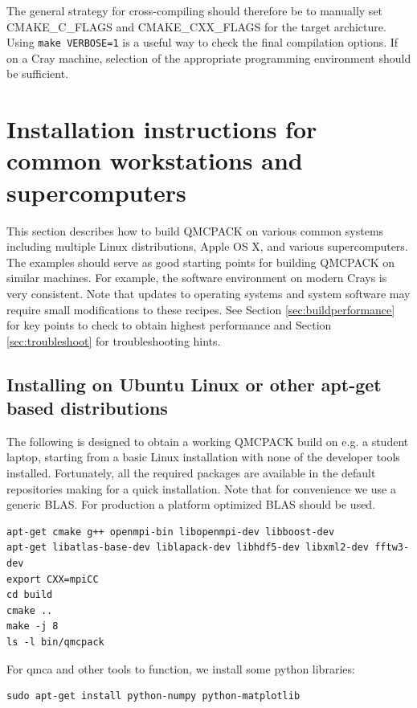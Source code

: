 The general strategy for cross-compiling should therefore be to
manually set CMAKE\_C\_FLAGS and CMAKE\_CXX\_FLAGS for the target
archicture. Using \texttt{make VERBOSE=1} is a useful way to check the
final compilation options.  If on a Cray machine, selection of the
appropriate programming environment should be sufficient.

\section{Installation instructions for common workstations and
  supercomputers}
\label{sec:installexamples}

This section describes how to build QMCPACK on various common systems
including multiple Linux distributions, Apple OS X, and various
supercomputers. The examples should serve as good starting points for
building QMCPACK on similar machines. For example, the software
environment on modern Crays is very consistent. Note that updates to
operating systems and system software may require small modifications
to these recipes. See Section \ref{sec:buildperformance} for key
points to check to obtain highest performance and
Section \ref{sec:troubleshoot} for troubleshooting hints.

\subsection{Installing on Ubuntu Linux or other apt-get based distributions}
\label{sec:buildubuntu}

The following is designed to obtain a working QMCPACK build on e.g. a
student laptop, starting from a basic Linux installation with none of
the developer tools installed. Fortunately, all the required packages
are available in the default repositories making for a quick
installation. Note that for convenience we use a generic BLAS. For
production a platform optimized BLAS should be used.

\verbatimfont{\footnotesize}
\begin{verbatim}
apt-get cmake g++ openmpi-bin libopenmpi-dev libboost-dev
apt-get libatlas-base-dev liblapack-dev libhdf5-dev libxml2-dev fftw3-dev
export CXX=mpiCC
cd build
cmake ..
make -j 8
ls -l bin/qmcpack
\end{verbatim}

For qmca and other tools to function, we install some python libraries:
\verbatimfont{\footnotesize}
\begin{verbatim}
sudo apt-get install python-numpy python-matplotlib
\end{verbatim}


